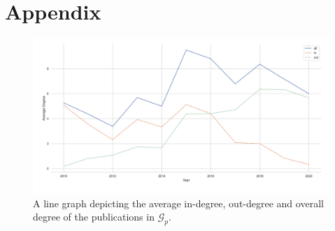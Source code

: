 \documentclass[11pt,a4paper]{book}
\theoremstyle{definition}
\theoremstyle{definition}
\theoremstyle{definition}
\theoremstyle{remark}
\newcommand{\pgraph}{\mathcal{G}_{p}}
\begin{document}

%
%
%
%





\chapter{Appendix}



\begin{figure}[h]
\includegraphics[width=\textwidth]{average_degree_year.png}
\caption{A line graph depicting the average in-degree, out-degree and overall degree of the publications in $\pgraph$.}
\label{fig:pgraph-avgr_degree_year}
\end{figure}
\end{document}
